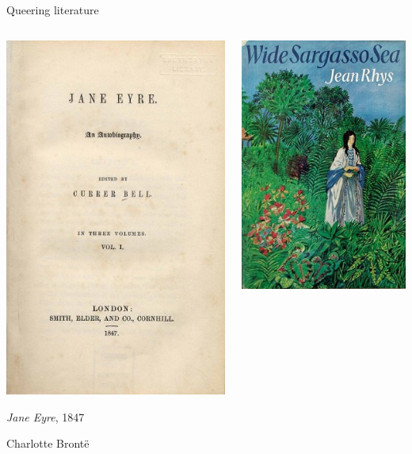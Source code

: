 \documentclass{beamer}
\begin{document}
\begin{frame}{Queering literature}

\begin{centering}
\begin{columns}

\begin{column}{0.5\textwidth}


\includegraphics[scale=1.2]{Jane_Eyre_title_page.jpg}
\medskip

\small{
\emph{Jane Eyre}, 1847

\medskip

Charlotte Bront\"e~\cite{bronte2000jane}
}

\end{column}

\begin{column}{0.5\textwidth}


\includegraphics[scale=0.55]{JeanRhys_WideSargassoSea.jpg}
\medskip


\end{column}
\end{columns}
\end{centering}
\end{frame}
\end{document}
